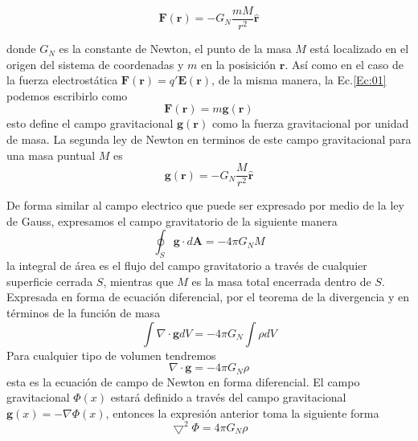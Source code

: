 \documentclass[12pt,twoside]{rif}
\begin{document}
			\begin{equation}
				\mathbf{F}(\mathbf{r}) = -G_N \frac{mM}{r^2}\hat{\mathbf{r}}
				\label{Ec:01}
			\end{equation}
			
			donde $G_N$ es la constante de Newton, el punto de la masa $M$ está localizado en el origen del sistema de coordenadas y $m$ en la posisición $\mathbf{r}$. Así como en el caso de la fuerza electrostática $\mathbf{F}(\mathbf{r}) = q' \mathbf{E}(\mathbf{r})$, de la misma manera, la Ec.\ref*{Ec:01} podemos escribirlo como 
			\begin{equation}
				\mathbf{F}(\mathbf{r}) = m \mathbf{g}(\mathbf{r})
				\label{Ec:02}
			\end{equation}
			esto define el campo gravitacional $\mathbf{g}(\mathbf{r})$ como la fuerza gravitacional por unidad de masa. La segunda ley de Newton en terminos de este campo gravitacional para una masa puntual $M$ es 
			\begin{equation}
				\mathbf{g}(\mathbf{r}) 
				=
				-G_{N} \frac{M}{r^2}\hat{\mathbf{r}}
				\label{Ec:03}
			\end{equation}

			De forma similar al campo electrico que puede ser expresado por medio de la ley de Gauss, expresamos el campo gravitatorio de la siguiente manera
			\begin{equation}
				\oint_{S} \mathbf{g} \cdot d\mathbf{A}
				=
				-4\pi G_{N} M
				\label{Ec:04}
			\end{equation}
			la integral de área es el flujo del campo gravitatorio a través de cualquier superficie cerrada $S$, mientras que $M$  es la masa total encerrada dentro de $S$. Expresada en forma de ecuación diferencial,  por el teorema de la divergencia y en términos de la función de masa
			\begin{equation}
				\int \nabla  \cdot \mathbf{g}dV 
				=
				-4 \pi G_N \int \rho dV
				\label{Ec:05}
			\end{equation}
			Para cualquier tipo de volumen tendremos
			\begin{equation}
				\nabla \cdot \mathbf{g}
				=
				-4 \pi G_N  \rho 
				\label{Ec:06}
			\end{equation}
			esta es la ecuación de campo de Newton en forma diferencial. El campo gravitacional $\Phi (x)$ estará definido a través del campo gravitacional $\mathbf{g}(x) = - \nabla \Phi(x)$, entonces la expresión anterior toma la siguiente forma 
			\begin{equation}
				\bigtriangledown^2 \Phi 
				=
				4 \pi G_N \rho
				\label{Ec:07}
			\end{equation}
\end{document}
